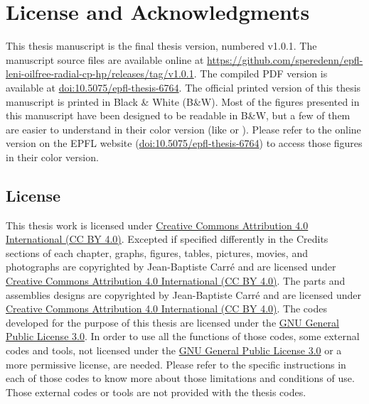 \chapter{License and Acknowledgments}
\label{chap:licenses}

This thesis manuscript is the final thesis version, numbered
v1.0.1. The manuscript source files are available online at
\href{https://github.com/speredenn/epfl-leni-oilfree-radial-cp-hp/releases/tag/v1.0.1}{https://github.com/speredenn/epfl-leni-oilfree-radial-cp-hp/releases/tag/v1.0.1}. The
compiled PDF version is available at
\href{http://dx.doi.org/10.5075/epfl-thesis-6764}{doi:10.5075/epfl-thesis-6764}. The
official printed version of this thesis manuscript is printed in Black
\& White (B\&W). Most of the figures presented in this manuscript have
been designed to be readable in B\&W, but a few of them are easier to
understand in their color version (like
 or
). Please refer to the
online version on the EPFL website
(\href{http://dx.doi.org/10.5075/epfl-thesis-6764}{doi:10.5075/epfl-thesis-6764})
to access those figures in their color version.

\section*{License}
\label{sec:licenses}

This thesis work is licensed under
\href{http://creativecommons.org/licenses/by/4.0/}{Creative Commons
  Attribution 4.0 International (CC BY
  4.0)}. Excepted
if specified differently in the Credits sections of each chapter,
graphs, figures, tables, pictures, movies, and photographs are
copyrighted by Jean-Baptiste Carré and are licensed under
\href{http://creativecommons.org/licenses/by/4.0/}{Creative Commons
  Attribution 4.0 International (CC BY 4.0)}. The parts and assemblies
designs are copyrighted by Jean-Baptiste Carré and are licensed under
\href{http://creativecommons.org/licenses/by/4.0/}{Creative Commons
  Attribution 4.0 International (CC BY 4.0)}. The codes developed for
the purpose of this thesis are licensed under the
\href{http://www.gnu.org/licenses/gpl.html}{GNU General Public License
  3.0}. In order to use
all the functions of those codes, some external codes and tools, not
licensed under the \href{http://www.gnu.org/licenses/gpl.html}{GNU
  General Public License 3.0} or a more permissive license, are
needed. Please refer to the specific instructions in each of those
codes to know more about those limitations and conditions of
use. Those external codes or tools are not provided with the thesis
codes.

